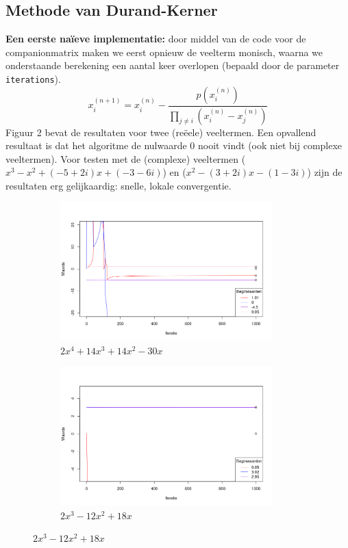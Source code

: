 \documentclass{article}
\begin{document}
\subsection{Methode van Durand-Kerner}
\textbf{Een eerste na\"ieve implementatie:} door middel van de code voor de companionmatrix maken we eerst opnieuw de veelterm monisch, waarna we onderstaande berekening een aantal keer overlopen (bepaald door de parameter \verb|iterations|).
\[
 x^{(n+1)}_i = x^{(n)}_i - \frac{p\left(x^{(n)}_i\right)}{\prod_{j \neq i}{\left(x^{(n)}_i - x^{(n)}_j\right)}}
\]
Figuur 2 bevat de resultaten voor twee (re\"eele) veeltermen. Een opvallend resultaat is dat het algoritme de nulwaarde 0 nooit vindt (ook niet bij complexe veeltermen). Voor testen met de (complexe) veeltermen (\(x^3 - x^2 + (-5 + 2i)x + (-3 - 6i)\)) en (\(x^2 - (3+2i)x - (1 - 3i)\)) zijn de resultaten erg gelijkaardig: snelle, lokale convergentie.
\begin{figure}[!htb]
 \caption{Resultaten}
 \begin{subfigure}{0.49\textwidth}
  \caption{\(2x^4 + 14x^3 + 14x^2 - 30x\)}
  \includegraphics[width=0.9\textwidth]{figures/dkern0}
 \end{subfigure}
  \begin{subfigure}{0.49\textwidth}
  \caption{\(2x^3 - 12x^2 + 18x\)}
  \includegraphics[width=0.9\textwidth]{figures/dkern1}
 \end{subfigure}
\end{figure}
\end{document}
